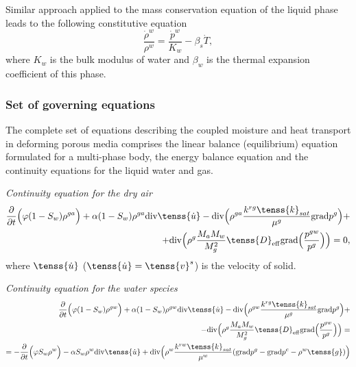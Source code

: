 Similar approach applied to the mass conservation equation of the liquid phase leads to the following constitutive equation
\begin{equation}\label{d16}
\frac {\dot{\rho}^w}{\rho^w} = \frac {\dot{p}^w}{K_w} - \beta_s \dot{T},
\end{equation}
where $K_w$ is the bulk modulus of water and $\beta_w$ is the thermal expansion coefficient of this phase.\\

\subsubsection{Set of governing equations}

The complete set of equations describing the coupled moisture and heat transport in deforming porous media comprises 
the linear balance (equilibrium) equation formulated for a multi-phase body, the energy balance equation and 
the continuity equations for the liquid water and gas.

{\it Continuity equation for the dry air}
\begin{eqnarray}\label{air}
\frac{\partial}{\partial t}\Big(\varphi(1-S_w)\rho^{ga}\Big) + \alpha(1-S_w)\rho^{ga} {\rm div} \tenss{\dot{u}} - 
{\rm div} \Big( \rho^{ga}\frac{k^{rg}\tenss{k}_{sat}}{{\mu}^{g}} {\rm grad}p^g\Big) + \nonumber\\
+{\rm div} \Big( \rho^g \frac{M_a M_w}{M^2_g} \tenss{D}_{\rm eff} {\rm grad} \Big( \frac{p^{gw}}{p^g} \Big) \Big) = 0,
\end{eqnarray}
where $\tenss{\dot{u}}$ ($\tenss{\dot{u}} = \tenss{v}^s$) is the velocity of solid.

{ \it Continuity equation for the water species}
\begin{eqnarray}\label{water}
\frac{\partial}{\partial t}\Big(\varphi(1-S_w)\rho^{gw}\Big) + \alpha(1-S_w)\rho^{gw} {\rm div} \tenss{\dot{u}} - 
{\rm div} \Big( \rho^{gw}\frac{k^{rg}\tenss{k}_{sat}}{{\mu}^{g}} {\rm grad}p^g\Big) + \nonumber\\
-{\rm div} \Big( \rho^g \frac{M_a M_w}{M^2_g} \tenss{D}_{\rm eff} {\rm grad} \Big( \frac{p^{gw}}{p^g} \Big) \Big) = \nonumber\\
=-\frac{\partial}{\partial t}\Big(\varphi S_w\rho^{w}\Big) - \alpha S_w \rho^{w} {\rm div} \tenss{\dot{u}} + 
{\rm div} \Big( \rho^{w}\frac{k^{rw}\tenss{k}_{sat}}{{\mu}^{w}} ({\rm grad}p^g - {\rm grad}p^c - \rho^w\tenss{g})\Big)
\end{eqnarray}

